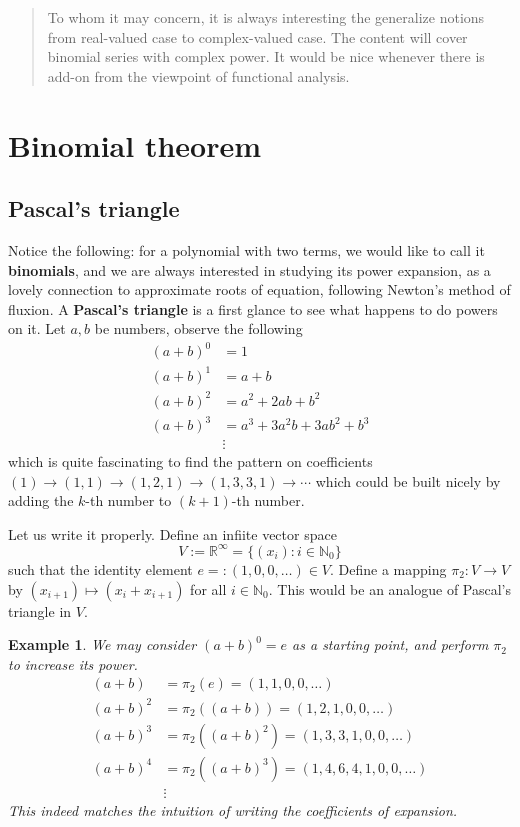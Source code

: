 \documentclass[12pt]{article}
\newtheorem*{example}{Example}
\begin{document}
    \begin{abstract}
        To whom it may concern, it is always interesting the generalize notions from real-valued case to complex-valued case. The content will cover binomial series with complex power. It would be nice whenever there is add-on from the viewpoint of functional analysis.
    \end{abstract}

    \section{Binomial theorem}

    \subsection{Pascal's triangle}

    Notice the following: for a polynomial with two terms, we would like to call it \textbf{binomials}, and we are always interested in studying its power expansion, as a lovely connection to approximate roots of equation, following Newton's method of fluxion. A \textbf{Pascal's triangle} is a first glance to see what happens to do powers on it. Let $a,b$ be numbers, observe the following\begin{align*}
        (a+b)^0&=1\\
        (a+b)^1&=a+b\\
        (a+b)^2&=a^2+2ab+b^2\\
        (a+b)^3&=a^3+3a^2b+3ab^2+b^3\\
        &\vdots
    \end{align*}
    which is quite fascinating to find the pattern on coefficients $(1)\to(1,1)\to(1,2,1)\to(1,3,3,1)\to\cdots$ which could be built nicely by adding the $k$-th number to $(k+1)$-th number.

    Let us write it properly. Define an infiite vector space \[V:=\mathbb{R}^{\infty}=\{(x_i):i\in\mathbb{N}_0\}\] such that the identity element $e=:(1,0,0,\dots)\in V$. Define a mapping $\pi_2:V\to V$ by $(x_{i+1})\mapsto (x_i+x_{i+1})$ for all $i\in\mathbb{N}_0$. This would be an analogue of Pascal's triangle in $V$.

    \begin{example}
        We may consider $(a+b)^0=e$ as a starting point, and perform $\pi_2$ to increase its power.\begin{align*}
            (a+b)&=\pi_2(e)=(1,1,0,0,\dots)\\
            (a+b)^2&=\pi_2((a+b))=(1,2,1,0,0,\dots)\\
            (a+b)^3&=\pi_2((a+b)^2)=(1,3,3,1,0,0,\dots)\\
            (a+b)^4&=\pi_2((a+b)^3)=(1,4,6,4,1,0,0,\dots)\\
            &\vdots
        \end{align*}
        This indeed matches the intuition of writing the coefficients of expansion.
    \end{example}
\end{document}
